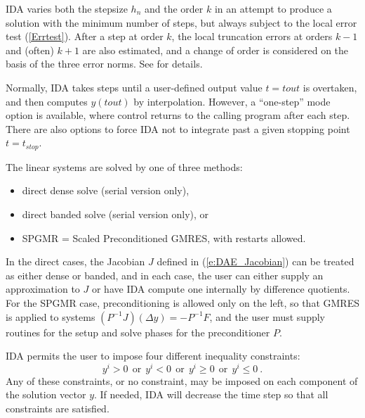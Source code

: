 IDA varies both the stepsize $h_n$ and the order $k$ in an attempt to
produce a solution with the minimum number of steps, but always
subject to the local error test (\ref{Errtest}).  After a step at
order $k$, the local truncation errors at orders $k-1$ and (often)
$k+1$ are also estimated, and a change of order is considered on the
basis of the three error norms.  See \cite{BCP:96} for details.  

Normally, IDA takes steps until a user-defined output value $t = tout$
is overtaken, and then computes $y(tout)$ by interpolation.  However,
a ``one-step'' mode option is available, where control returns to the
calling program after each step.  There are also options to force IDA
not to integrate past a given stopping point $t = t_{stop}$.

The linear systems are solved by one of three methods:
\begin{itemize}
\item direct dense solve (serial version only),
\item direct banded solve (serial version only), or
\item SPGMR = Scaled Preconditioned GMRES, with restarts allowed.
\end{itemize}
In the direct cases, the Jacobian
$J$ defined in (\ref{e:DAE_Jacobian}) can be treated as either dense or banded,
and in each case, the user can either supply an approximation to $J$
or have IDA compute one internally by difference quotients.
For the SPGMR case, preconditioning is allowed only on the left, so that GMRES
is applied to systems $(P^{-1}J)(\Delta y) = -P^{-1}F$, and
the user must supply routines for the setup and solve phases for
the preconditioner $P$.

IDA permits the user to impose four different inequality constraints:
\begin{equation}
  y^i > 0~~ \mbox{or} ~~ y^i < 0~~ \mbox{or} ~~y^i \geq 0~~
  \mbox{or} ~~y^i \leq 0 ~.
\end{equation}
Any of these constraints, or no constraint, may be imposed on each
component of the solution vector $y$.  If needed, IDA will decrease 
the time step so that all constraints are satisfied.


